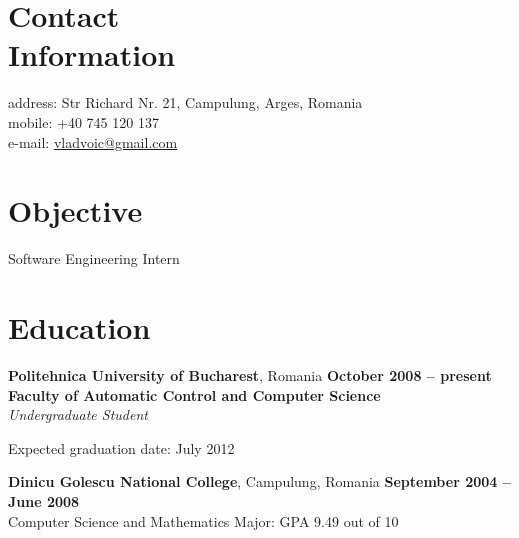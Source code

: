 \documentclass[margin,line]{resume}
\begin{document}
\begin{resume}

    \section{\mysidestyle Contact\\Information}

    
	address: Str Richard Nr. 21, Campulung, Arges, Romania\\
	mobile: +40 745 120 137              \\
	e-mail:  \href{mailto:vladvoic@gmail.com}{vladvoic@gmail.com}  \vspace{0mm}\\\vspace{-4.5mm}%


    \section{\mysidestyle Objective}

	Software Engineering Intern 


    \section{\mysidestyle Education}

    \textbf{Politehnica University of Bucharest}, Romania \hfill \textbf{ October 2008 -- present}\vspace{1mm}\\%
	\small{\textbf{Faculty of Automatic Control and Computer Science}}\\
    \textsl{Undergraduate Student} %
    \begin{list2}
        \item Expected graduation date: July 2012
    \end{list2}\vspace{-1mm}

    \textbf{Dinicu Golescu National College}, Campulung, Romania \hfill \textbf{September 2004 -- June 2008}\\%
	\small{Computer Science and Mathematics Major: GPA 9.49 out of 10}



\end{resume}
\end{document}
